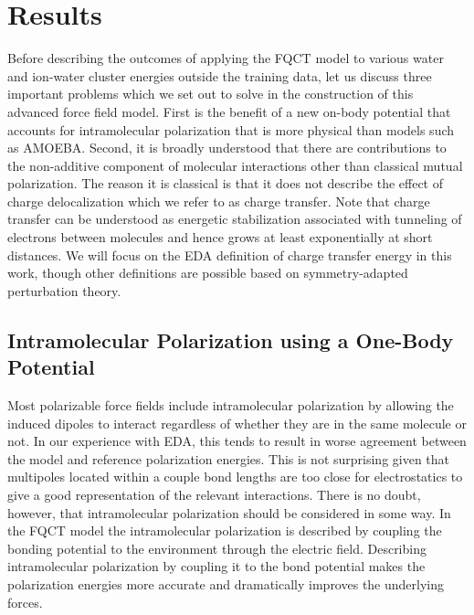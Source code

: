 \documentclass[journal=jctcce,manuscript=article]{achemso}
\begin{document}
\section*{Results}
Before describing the outcomes of applying the FQCT model to various water and
ion-water cluster energies outside the training data, let us discuss three important problems which we set out to solve in the construction of this advanced force field model. First is the benefit of a new on-body potential that accounts for intramolecular polarization that is more physical than models such as AMOEBA. Second, it is broadly understood that there are
contributions to the non-additive component of molecular interactions other than
classical mutual polarization.\cite{herman2023accurate} The reason it is classical
is that it does not describe the effect of charge delocalization which we refer to
as charge transfer. Note that charge transfer can be understood as energetic
stabilization associated with tunneling of electrons between molecules
and hence grows at least exponentially at short distances.\cite{misquitta2013charge} We will focus on the EDA definition of charge transfer energy in this work, though
other definitions are possible based on symmetry-adapted perturbation theory.\cite{stone2009charge,misquitta2013charge}

\subsection*{Intramolecular Polarization using a One-Body Potential }
Most polarizable force fields include intramolecular polarization by allowing the induced
dipoles to interact regardless of whether they are in the same molecule or not. In our
experience with EDA, this tends to result in worse agreement between the model and reference polarization
energies. This is not surprising given that multipoles located within a couple bond lengths
are too close for electrostatics to give a good representation of the relevant interactions.
There is no doubt, however, that intramolecular polarization should be considered in some way. In the FQCT model the intramolecular polarization is described by coupling the bonding potential
to the environment through the electric field. Describing intramolecular polarization by coupling it to the bond potential
makes the polarization energies more accurate and dramatically improves the underlying forces.
\end{document}
